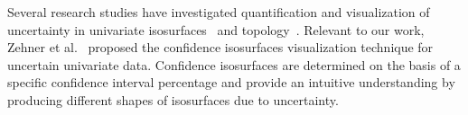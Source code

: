 %

%
%
Several research studies have investigated quantification and visualization of uncertainty in univariate isosurfaces~\cite{CRJ:Gri2004, pothkow:2011:PMC, AthawaleJohnson2019} and topology~\cite{athawale2020uncertainty, yan2020structural,favelier2019persistence}.
%
Relevant to our work, Zehner et al.~\cite{zehner2010visualization} proposed the confidence isosurfaces visualization technique for uncertain univariate data.
%
%
Confidence isosurfaces are determined on the basis of a specific confidence interval percentage and provide an intuitive understanding by producing different shapes of isosurfaces due to uncertainty. 
%
